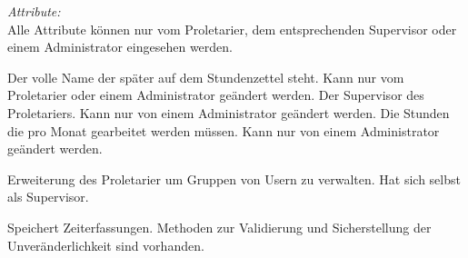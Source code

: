 \begin{itemize}
                \emph{Attribute:}\\
                Alle Attribute können nur vom Proletarier, dem entsprechenden Supervisor oder einem Administrator eingesehen werden.
                \begin{itemize}
                        Der volle Name der später auf dem Stundenzettel steht.
                        Kann nur vom Proletarier oder einem Administrator geändert werden.
                        Der Supervisor des Proletariers.
                        Kann nur von einem Administrator geändert werden.
                        Die Stunden die pro Monat gearbeitet werden müssen.
                        Kann nur von einem Administrator geändert werden.
                \end{itemize}

                Erweiterung des Proletarier um Gruppen von Usern zu verwalten.
                Hat sich selbst als Supervisor.

                Speichert Zeiterfassungen. Methoden zur Validierung und Sicherstellung der Unveränderlichkeit sind vorhanden.
                

\end{itemize}

